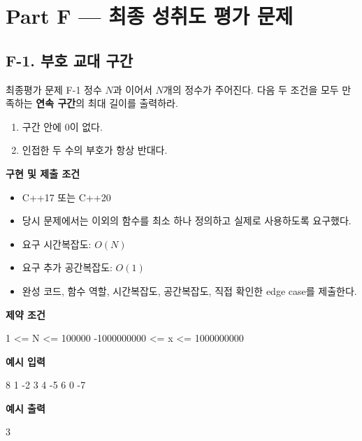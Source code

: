 \section{Part F --- 최종 성취도 평가 문제}

\subsection{F-1. 부호 교대 구간}
\begin{problembox}{최종평가 문제 F-1}
정수 $N$과 이어서 $N$개의 정수가 주어진다. 다음 두 조건을 모두 만족하는 \textbf{연속 구간}의 최대 길이를 출력하라.
\begin{enumerate}
  \item 구간 안에 0이 없다.
  \item 인접한 두 수의 부호가 항상 반대다.
\end{enumerate}

\textbf{구현 및 제출 조건}
\begin{itemize}
  \item C++17 또는 C++20
  \item 당시 문제에서는  이외의 함수를 최소 하나 정의하고 실제로 사용하도록 요구했다.
  \item 요구 시간복잡도: $O(N)$
  \item 요구 추가 공간복잡도: $O(1)$
  \item 완성 코드, 함수 역할, 시간복잡도, 공간복잡도, 직접 확인한 edge case를 제출한다.
\end{itemize}

\textbf{제약 조건}
\begin{TextBlock}
1 <= N <= 100000
-1000000000 <= x <= 1000000000
\end{TextBlock}

\textbf{예시 입력}
\begin{TextBlock}
8
1 -2 3 4 -5 6 0 -7
\end{TextBlock}

\textbf{예시 출력}
\begin{TextBlock}
3
\end{TextBlock}
\end{problembox}


